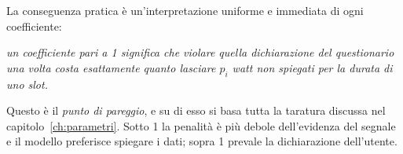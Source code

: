 La conseguenza pratica è un'interpretazione uniforme e immediata di ogni coefficiente:
\begin{center}
\begin{minipage}{0.88\textwidth}
\itshape
un coefficiente pari a 1 significa che violare quella dichiarazione del questionario una volta
costa esattamente quanto lasciare $p_i$ watt non spiegati per la durata di uno slot.
\end{minipage}
\end{center}

Questo è il \emph{punto di pareggio}, e su di esso si basa tutta la taratura discussa nel
capitolo~\ref{ch:parametri}. Sotto 1 la penalità è più debole dell'evidenza del segnale e il
modello preferisce spiegare i dati; sopra 1 prevale la dichiarazione dell'utente.
